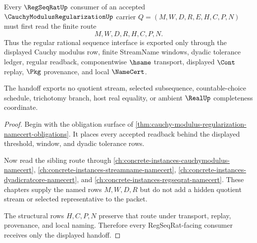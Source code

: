 \begin{theorem}
\label{thm:cauchy-modulus-regularization-regseqrat-handoff}
Every $\RegSeqRatUp$ consumer of an accepted $\CauchyModulusRegularizationUp$ carrier $Q=(M,W,D,R,E,H,C,P,N)$ must first read the finite route
$$
M,W,D,R,H,C,P,N .
$$
Thus the regular rational sequence interface is exported only through the displayed Cauchy modulus row, finite StreamName windows, dyadic tolerance ledger, regular readback, componentwise $\hsame$ transport, displayed $\Cont$ replay, $\Pkg$ provenance, and local $\NameCert$.

The handoff exports no quotient stream, selected subsequence, countable-choice schedule, trichotomy branch, host real equality, or ambient $\RealUp$ completeness coordinate.
\end{theorem}
\begin{proof}
Begin with the obligation surface of \autoref{thm:cauchy-modulus-regularization-namecert-obligations}. It places every accepted readback behind the displayed threshold, window, and dyadic tolerance rows.

Now read the sibling route through \autoref{ch:concrete-instances-cauchymodulus-namecert}, \autoref{ch:concrete-instances-streamname-namecert}, \autoref{ch:concrete-instances-dyadicratcore-namecert}, and \autoref{ch:concrete-instances-regseqrat-namecert}. These chapters supply the named rows $M,W,D,R$ but do not add a hidden quotient stream or selected representative to the packet.

The structural rows $H,C,P,N$ preserve that route under transport, replay, provenance, and local naming. Therefore every RegSeqRat-facing consumer receives only the displayed handoff.
\end{proof}

